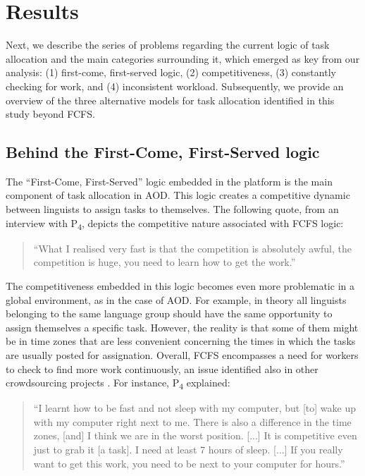 
\section{Results}\label{sec:results}

Next, we describe the series of problems regarding the current logic of task allocation and the main categories surrounding it, which emerged as key from our analysis: (1) first-come, first-served logic, (2) competitiveness, (3) constantly checking for work, and (4) inconsistent workload. Subsequently, we provide an overview of the three alternative models for task allocation identified in this study beyond FCFS.

\subsection{Behind the First-Come, First-Served logic}
\label{subsec:fcfs}

The ``First-Come, First-Served'' logic embedded in the platform is the main component of task allocation in AOD. This logic creates a competitive dynamic between linguists to assign tasks to themselves. The following quote, from an interview with P\textsubscript{4}, depicts the competitive nature associated with FCFS logic:

\begin{quote}
``What I realised very fast is that the competition is absolutely awful, the competition is huge, you need to learn how to get the work.''
\end{quote}

The competitiveness embedded in this logic becomes even more problematic in a global environment, as in the case of AOD. For example, in theory all linguists belonging to the same language group should have the same opportunity to assign themselves a specific task. However, the reality is that some of them might be in time zones that are less convenient concerning the times in which the tasks are usually posted for assignation. Overall, FCFS encompasses a need for workers to check to find more work continuously, an issue identified also in other crowdsourcing projects \cite{gray2019ghost}. For instance,  P\textsubscript{4} explained:

\begin{quote}
``I learnt how to be fast and not sleep with my computer, but [to] wake up with my computer right next to me. There is also a difference in the time zones, [and] I think we are in the worst position. [...] It is competitive even just to grab it [a task]. I need at least 7 hours of sleep. [...] If you really want to get this work, you need to be next to your computer for hours.''
\end{quote}

